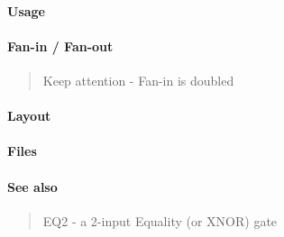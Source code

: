 \paragraph{Usage}

\paragraph{Fan-in / Fan-out}
\begin{quote}
    Keep attention - Fan-in is doubled
\end{quote}

\paragraph{Layout}

\paragraph{Files}


\paragraph{See also}
\begin{quote}
    EQ2 - a 2-input Equality (or XNOR) gate
\end{quote}

